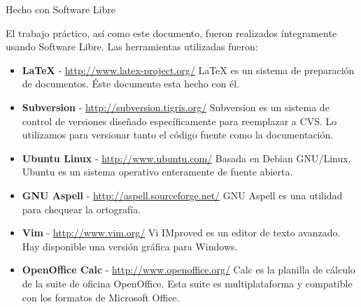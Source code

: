 %
% 
%

\thispagestyle{empty}

\begin{center}
\LARGE{Hecho con Software Libre}
\end{center}

\noindent

El trabajo práctico, así como este documento, fueron realizados íntegramente
usando Software Libre. Las herramientas utilizadas fueron:

\begin{flushleft}
\begin{itemize}

\item \textbf{\LaTeX} - \href{http://www.latex-project.org/}
  {http://www.latex-project.org/}
\linebreak\LaTeX{} es un sistema de preparación de documentos. Éste
  documento esta hecho con él.

\item \textbf{Subversion} - \href{http://subversion.tigris.org/}
  {http://subversion.tigris.org/}
\linebreak Subversion es un sistema de control de versiones diseñado
  específicamente para reemplazar a CVS. Lo utilizamos para versionar
  tanto el código fuente como la documentación.

\item \textbf{Ubuntu Linux} - \href{http://www.ubuntu.com/}
  {http://www.ubuntu.com/}
\linebreak Basada en Debian GNU/Linux, Ubuntu es un sistema operativo
enteramente de fuente abierta.

\item \textbf{GNU Aspell} - \href{http://aspell.sourceforge.net//}
  {http://aspell.sourceforge.net/}
\linebreak GNU Aspell es una utilidad para chequear la ortografía.

\item \textbf{Vim} - \href{http://www.vim.org/}
  {http://www.vim.org/}
\linebreak Vi IMproved es un editor de texto avanzado. Hay disponible una
versión gráfica para Windows.

\item \textbf{OpenOffice Calc} - \href{http://www.openoffice.org/}
  {http://www.openoffice.org/}
\linebreak Calc es la planilla de cálculo de la suite de oficina OpenOffice.
Esta suite es multiplataforma y compatible con los formatos de Microsoft
Office.


\end{itemize}
\end{flushleft}
